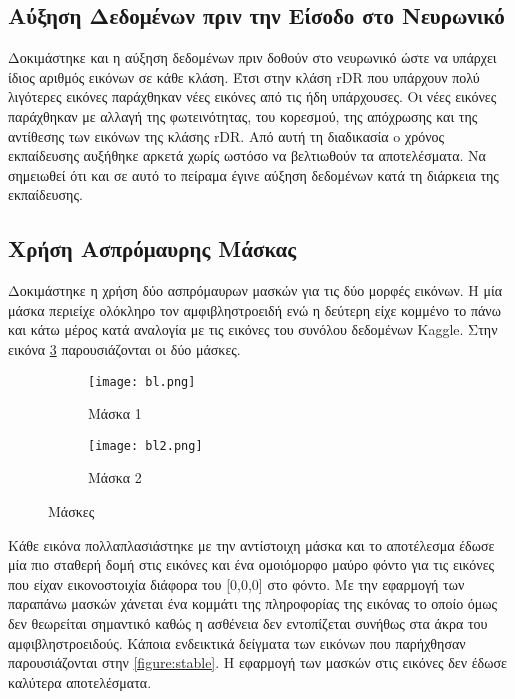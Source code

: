 \subsection{Αύξηση Δεδομένων πριν την Είσοδο στο Νευρωνικό}
\label{subsec:5.4.3}
Δοκιμάστηκε και η αύξηση δεδομένων πριν δοθούν στο νευρωνικό ώστε να υπάρχει ίδιος αριθμός εικόνων σε κάθε κλάση. Έτσι στην κλάση rDR που υπάρχουν πολύ λιγότερες εικόνες παράχθηκαν νέες εικόνες  από τις ήδη υπάρχουσες. Οι νέες εικόνες παράχθηκαν με αλλαγή της φωτεινότητας, του κορεσμού, της απόχρωσης και της αντίθεσης των εικόνων της κλάσης rDR. Από αυτή τη διαδικασία o  χρόνος εκπαίδευσης αυξήθηκε αρκετά χωρίς ωστόσο να βελτιωθούν τα αποτελέσματα. Να σημειωθεί ότι και σε αυτό το πείραμα έγινε αύξηση δεδομένων κατά τη διάρκεια της εκπαίδευσης.

\subsection{Χρήση Ασπρόμαυρης Μάσκας}
\label{subsec:5.4.4}
Δοκιμάστηκε η χρήση δύο ασπρόμαυρων μασκών για τις δύο μορφές εικόνων. Η μία μάσκα περιείχε ολόκληρο τον αμφιβληστροειδή ενώ η δεύτερη είχε κομμένο το πάνω και κάτω μέρος κατά αναλογία με τις εικόνες του συνόλου δεδομένων Kaggle. Στην εικόνα \ref{figure:bl} παρουσιάζονται οι δύο μάσκες. 


\begin{figure}[!h]
\centering
\begin{subfigure}{.5\textwidth}
  \centering
  \texttt{[image: bl.png]}
  \caption{Μάσκα 1}
  \label{fig:bl1}
\end{subfigure}
\qquad
\begin{subfigure}{.5\textwidth}
  \centering
  \texttt{[image: bl2.png]}
  \caption{Μάσκα 2}
  \label{fig:bl2}
\end{subfigure}
\caption{Μάσκες}
\label{figure:bl}
\end{figure}

Κάθε εικόνα πολλαπλασιάστηκε με την αντίστοιχη μάσκα και το αποτέλεσμα έδωσε μία πιο σταθερή δομή στις εικόνες και ένα ομοιόμορφο μαύρο φόντο για τις εικόνες που είχαν εικονοστοιχία διάφορα του [0,0,0] στο φόντο. Με την εφαρμογή των παραπάνω μασκών χάνεται ένα κομμάτι της πληροφορίας της εικόνας το οποίο όμως δεν θεωρείται σημαντικό καθώς  η ασθένεια δεν εντοπίζεται συνήθως στα άκρα του αμφιβληστροειδούς. Κάποια ενδεικτικά δείγματα των εικόνων που παρήχθησαν παρουσιάζονται στην \ref{figure:stable}. Η εφαρμογή των μασκών στις εικόνες δεν έδωσε καλύτερα αποτελέσματα.

